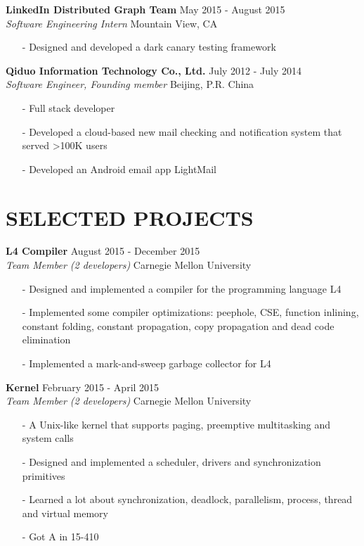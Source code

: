 \documentclass[mm, 7pt]{resume} %
\begin{document}
\begin{resume}
\textbf{LinkedIn Distributed Graph Team} \hfill May 2015 - August 2015 \\
{\sl Software Engineering Intern}  \hfill Mountain View, CA
\begin{itemize} \itemsep -2pt
\item[-] Designed and developed a dark canary testing framework
\end{itemize}

\textbf{Qiduo Information Technology Co., Ltd.}  \hfill  July 2012 - July 2014 \\
{\sl Software Engineer, Founding member}                          \hfill  Beijing, P.R. China
\begin{itemize} \itemsep -2pt
\item[-] Full stack developer
\item[-] Developed a cloud-based new mail checking and notification system that served >100K users
\item[-] Developed an Android email app LightMail
\end{itemize}


\section{SELECTED PROJECTS}

\textbf{L4 Compiler} \hfill August 2015 - December 2015 \\
{\sl Team Member (2 developers)} \hfill Carnegie Mellon University
\begin{itemize} \itemsep -2pt
\item[-] Designed and implemented a compiler for the programming language L4
\item[-] Implemented some compiler optimizations: peephole, CSE, function inlining, constant folding, constant propagation, copy propagation and dead code elimination
\item[-] Implemented a mark-and-sweep garbage collector for L4
\end{itemize}

\textbf{Kernel} \hfill February 2015 - April 2015 \\
{\sl Team Member (2 developers)} \hfill Carnegie Mellon University
\begin{itemize} \itemsep -2pt
\item[-] A Unix-like kernel that supports paging, preemptive multitasking and system calls
\item[-] Designed and implemented a scheduler, drivers and synchronization primitives
\item[-] Learned a lot about synchronization, deadlock, parallelism, process, thread and virtual memory
\item[-] Got A in 15-410
\end{itemize}


\end{resume}
\end{document}
